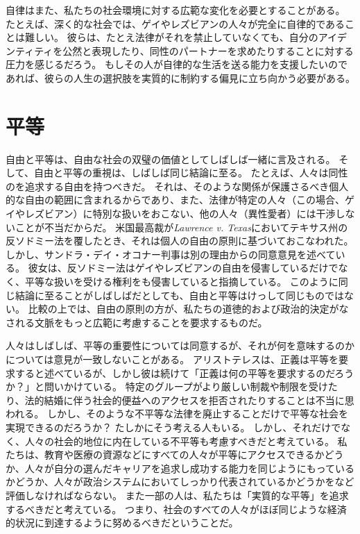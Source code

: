\documentclass[paper=a4,book,openany]{jlreq}
\begin{document}
自律はまた、私たちの社会環境に対する広範な変化を必要とすることがある。
たとえば、深く的な社会では、ゲイやレズビアンの人々が完全に自律的であることは難しい。
彼らは、たとえ法律がそれを禁止していなくても、自分のアイデンティティを公然と表現したり、同性のパートナーを求めたりすることに対する圧力を感じるだろう。
もしその人が自律的な生活を送る能力を支援したいのであれば、彼らの人生の選択肢を実質的に制約する偏見に立ち向かう必要がある。

\section{平等}

自由と平等は、自由な社会の双璧の価値としてしばしば一緒に言及される。
そして、自由と平等の重視は、しばしば同じ結論に至る。
たとえば、人々は同性のを追求する自由を持つべきだ。
それは、そのような関係が保護さるべき個人的な自由の範囲に含まれるからであり、また、法律が特定の人々（この場合、ゲイやレズビアン）に特別な扱いをおこない、他の人々（異性愛者）には干渉しないことが不当だからだ。
米国最高裁が\emph{Lawrence v. Texas}においてテキサス州の反ソドミー法を覆したとき、それは個人の自由の原則に基づいておこなわれた。
しかし、サンドラ・デイ・オコナー判事は別の理由からの同意意見を述べている。
彼女は、反ソドミー法はゲイやレズビアンの自由を侵害しているだけでなく、平等な扱いを受ける権利をも侵害していると指摘している。
このように同じ結論に至ることがしばしばだとしても、自由と平等はけっして同じものではない。
比較の上では、自由の原則の方が、私たちの道徳的および政治的決定がなされる文脈をもっと広範に考慮することを要求するものだ。

人々はしばしば、平等の重要性については同意するが、それが何を意味するのかについては意見が一致しないことがある。
アリストテレスは、正義は平等を要求すると述べているが、しかし彼は続けて「正義は何の平等を要求するのだろうか？」と問いかけている。
特定のグループがより厳しい制裁や制限を受けたり、法的結婚に伴う社会的便益へのアクセスを拒否されたりすることは不当に思われる。
しかし、そのような不平等な法律を廃止することだけで平等な社会を実現できるのだろうか？ たしかにそう考える人もいる。
しかし、それだけでなく、人々の社会的地位に内在している不平等も考慮すべきだと考えている。
私たちは、教育や医療の資源などにすべての人々が平等にアクセスできるかどうか、人々が自分の選んだキャリアを追求し成功する能力を同じようにもっているかどうか、人々が政治システムにおいてしっかり代表されているかどうかをなど評価しなければならない。
また一部の人は、私たちは「実質的な平等」を追求するべきだと考えている。
つまり、社会のすべての人々がほぼ同じような経済的状況に到達するように努めるべきだということだ。
\end{document}
